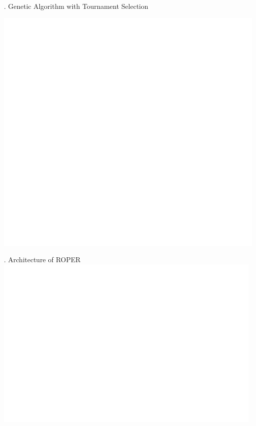 \documentclass[9pt]{beamer}
\begin{document}
\begin{frame}{\theframenumber. Genetic Algorithm with Tournament Selection}
  \begin{center}
  \includegraphics[height=.85\textheight,width=\textwidth]{../images/tournament.png}
  \end{center}
\end{frame}

\begin{frame}{\theframenumber. Architecture of ROPER}
      \includegraphics[width=\textwidth]{../images/architecture-transparent.png}
\end{frame}
\end{document}
